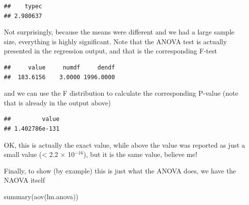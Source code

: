 \documentclass[
]{book}
\newenvironment{Shaded}{\begin{snugshade}}{\end{snugshade}}
\newcommand{\DecValTok}[1]{\textcolor[rgb]{0.00,0.00,0.81}{#1}}
\newcommand{\FunctionTok}[1]{\textcolor[rgb]{0.00,0.00,0.00}{#1}}
\newcommand{\NormalTok}[1]{#1}
\newcommand{\OtherTok}[1]{\textcolor[rgb]{0.56,0.35,0.01}{#1}}
\newcommand{\SpecialCharTok}[1]{\textcolor[rgb]{0.00,0.00,0.00}{#1}}
\begin{document}
\begin{verbatim}
##    typec 
## 2.980637
\end{verbatim}

Not surprisingly, because the means were different and we had a large sample size, everything is highly significant. Note that the ANOVA test is actually presented in the regression output, and that is the corresponding F-test

\begin{Shaded}
\end{Shaded}

\begin{verbatim}
##     value     numdf     dendf 
##  183.6156    3.0000 1996.0000
\end{verbatim}

and we can use the F distribution to calculate the corresponding P-value (note that is already in the output above)

\begin{Shaded}
\end{Shaded}

\begin{verbatim}
##         value 
## 1.402786e-131
\end{verbatim}

OK, this is actually the exact value, while above the value was reported as just a small value (\textless{} 2.2 \(\times\) 10\(^{-16}\)), but it is the same value, believe me!

Finally, to show (by example) this is just what the ANOVA does, we have the NAOVA itself

\begin{Shaded}
\begin{Highlighting}[]
\FunctionTok{summary}\NormalTok{(}\FunctionTok{aov}\NormalTok{(lm.anova))}
\end{Highlighting}
\end{Shaded}
\end{document}
